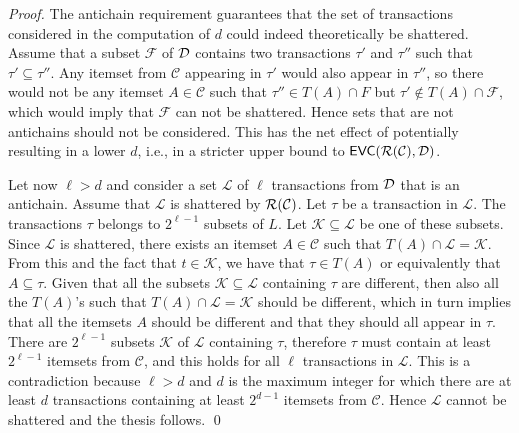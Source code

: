 \ifarxiv
\begin{proof}
  The antichain requirement guarantees that the set of transactions considered in
  the computation of $d$ could indeed theoretically be shattered. Assume that a
  subset $\mathcal{F}$ of ${\cal D}$ contains two transactions $\tau'$ and $\tau''$
  such that $\tau'\subseteq\tau''$. Any itemset from $\mathcal{C}$
  appearing in $\tau'$ would also appear in $\tau''$, so there would not be any
  itemset $A\in\mathcal{C}$ such that $\tau''\in T(A)\cap F$ but
  $\tau'\not\in T(A)\cap \mathcal{F}$, which would imply that $\mathcal{F}$ can
  not be shattered. Hence sets that are not antichains should not be
  considered. This has the net effect of potentially resulting in a lower $d$,
  i.e., in a stricter upper bound to $\mathsf{EVC}(\mathcal{R}(\mathcal{C}),{\cal D})$.

  Let now $\ell>d$ and consider a set $\mathcal{L}$ of $\ell$ transactions from
  ${\cal D}$ that is an antichain. Assume that $\mathcal{L}$ is shattered by
  $\mathcal{R}(\mathcal{C})$. Let $\tau$ be a transaction in $\mathcal{L}$.
  The transactions $\tau$ belongs to $2^{\ell-1}$ subsets of $L$. Let
  $\mathcal{K}\subseteq \mathcal{L}$ be one of these subsets. Since
  $\mathcal{L}$ is shattered, there exists an itemset $A\in\mathcal{C}$ such
  that $T(A)\cap \mathcal{L}=\mathcal{K}$. From this and the fact
  that $t\in \mathcal{K}$, we have that $\tau\in T(A)$ or equivalently that
  $A\subseteq\tau$. Given that all the subsets $\mathcal{K}\subseteq\mathcal{L}$
  containing $\tau$ are different, then also all the $T(A)$'s such that
  $T(A)\cap \mathcal{L}=\mathcal{K}$ should be
  different, which in turn implies that all the itemsets
  $A$ should be different and that they should all appear in $\tau$. There are
  $2^{\ell-1}$ subsets $\mathcal{K}$ of $\mathcal{L}$ containing $\tau$,
  therefore $\tau$ must contain at least $2^{\ell-1}$ itemsets from
  $\mathcal{C}$, and this holds for all $\ell$ transactions in $\mathcal{L}$. This is a
  contradiction because $\ell>d$ and $d$ is the
  maximum integer for which there are at least $d$ transactions containing at
  least $2^{d-1}$ itemsets from $\mathcal{C}$. Hence $\mathcal{L}$ cannot be shattered and
  the thesis follows.
  \qed
\end{proof}
\fi

